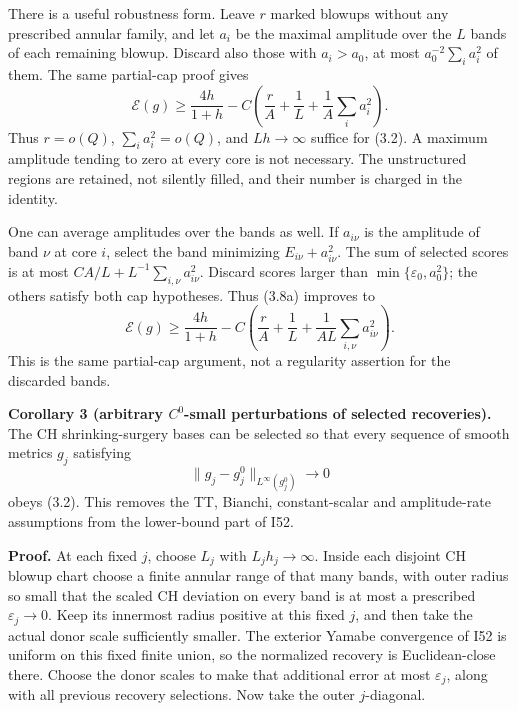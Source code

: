 \documentclass[
  11pt,
]{article}
\begin{document}
There is a useful robustness form. Leave \(r\) marked blowups without
any prescribed annular family, and let \(a_i\) be the maximal amplitude
over the \(L\) bands of each remaining blowup. Discard also those with
\(a_i>a_0\), at most \(a_0^{-2}\sum_i a_i^2\) of them. The same
partial-cap proof gives \[
 \mathcal E(g)\ge\frac{4h}{1+h}
       -C\left(\frac rA+\frac1L+\frac1A\sum_i a_i^2\right).
                                                               \tag{3.8a}
\] Thus \(r=o(Q)\), \(\sum_i a_i^2=o(Q)\), and \(Lh\to\infty\) suffice
for (3.2). A maximum amplitude tending to zero at every core is not
necessary. The unstructured regions are retained, not silently filled,
and their number is charged in the identity.

One can average amplitudes over the bands as well. If \(a_{i\nu}\) is
the amplitude of band \(\nu\) at core \(i\), select the band minimizing
\(E_{i\nu}+a_{i\nu}^2\). The sum of selected scores is at most
\(CA/L+L^{-1}\sum_{i,\nu}a_{i\nu}^2\). Discard scores larger than
\(\min\{\varepsilon_0,a_0^2\}\); the others satisfy both cap hypotheses.
Thus (3.8a) improves to \[
 \mathcal E(g)\ge\frac{4h}{1+h}
       -C\left(\frac rA+\frac1L+
                      \frac1{AL}\sum_{i,\nu}a_{i\nu}^2\right).
                                                               \tag{3.8b}
\] This is the same partial-cap argument, not a regularity assertion for
the discarded bands.

\textbf{Corollary 3 (arbitrary \(C^0\)-small perturbations of selected
recoveries).} The CH shrinking-surgery bases can be selected so that
every sequence of smooth metrics \(g_j\) satisfying \[
                   \|g_j-g_j^0\|_{L^\infty(g_j^0)}\to0
\] obeys (3.2). This removes the TT, Bianchi, constant-scalar and
amplitude-rate assumptions from the lower-bound part of I52.

\textbf{Proof.} At each fixed \(j\), choose \(L_j\) with
\(L_jh_j\to\infty\). Inside each disjoint CH blowup chart choose a
finite annular range of that many bands, with outer radius so small that
the scaled CH deviation on every band is at most a prescribed
\(\varepsilon_j\to0\). Keep its innermost radius positive at this fixed
\(j\), and then take the actual donor scale sufficiently smaller. The
exterior Yamabe convergence of I52 is uniform on this fixed finite
union, so the normalized recovery is Euclidean-close there. Choose the
donor scales to make that additional error at most \(\varepsilon_j\),
along with all previous recovery selections. Now take the outer
\(j\)-diagonal.
\end{document}
